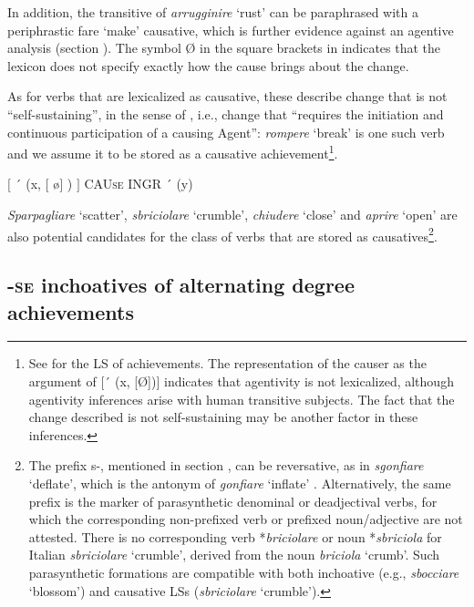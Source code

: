\documentclass[output=paper,colorlinks,citecolor=brown
]{langscibook}
\begin{document}
In addition, the transitive of \textit{arrugginire} ‘rust’ can be paraphrased with a periphrastic fare ‘make’ causative, which is further evidence against an agentive analysis (section ). The symbol Ø in the square brackets in  indicates that the lexicon does not specify exactly how the cause brings about the change.

As for verbs that are lexicalized as causative, these describe change that is not “self-sustaining”, in the sense of \citet[496]{kiparsky1997remarks}, i.e., change that “requires the initiation and continuous participation of a causing Agent”: \textit{rompere} ‘break’ is one such verb and we assume it to be stored as a causative achievement\footnote{See \citet[114]{vanvalin2023principles} for the LS of achievements. The representation of the causer as the argument of [´ (x, [Ø])] indicates  that agentivity is not lexicalized, although agentivity inferences arise with human transitive subjects. The fact that the change described is not self-sustaining may be another factor in these inferences.}. 

\ea \label{bentley_example_47}
    $\lbrack$ ´ (x, $\lbrack$ \o $\rbrack$ ) $\rbrack$ CAU\textsc{se} INGR ´ (y)
\z

\textit{Sparpagliare} ‘scatter’, \textit{sbriciolare} ‘crumble’, \textit{chiudere} ‘close’ and \textit{aprire} ‘open’ are also potential candidates for the class of verbs that are stored as causatives\footnote{The prefix s-, mentioned in section , can be reversative, as in \textit{sgonfiare} ‘deflate’, which is the antonym of \textit{gonfiare} ‘inflate’ \citep{iacobini2004prefissazione}. Alternatively, the same prefix is the marker of parasynthetic denominal or deadjectival verbs, for which the corresponding non-prefixed verb or prefixed noun/adjective are not attested. There is no corresponding verb *\textit{briciolare} or noun *\textit{sbriciola} for Italian \textit{sbriciolare} ‘crumble’, derived from the noun \textit{briciola} ‘crumb’. Such parasynthetic formations are compatible with both inchoative (e.g., \textit{sbocciare} ‘blossom’) and causative LSs (\textit{sbriciolare} ‘crumble’).}. 

\subsection{-\textsc{se} inchoatives of alternating degree achievements}
\label{bentley_section_5.3}
\end{document}
